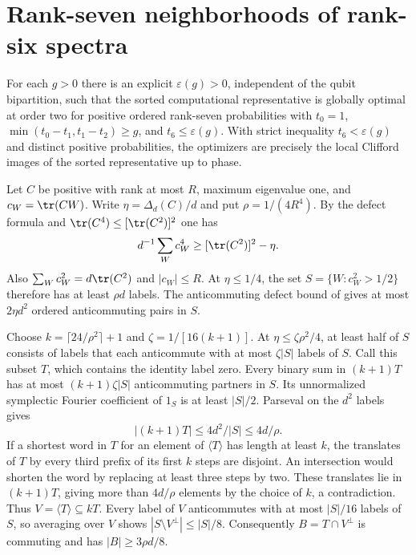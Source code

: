 \section{Rank-seven neighborhoods of rank-six spectra}

\begin{theorem}\label{thm:rank6-neighborhood}
For each \(g>0\) there is an explicit \(\varepsilon(g)>0\),
independent of the qubit bipartition, such that the sorted
computational representative is globally optimal at order two
for positive ordered rank-seven probabilities with \(t_0=1\),
\(\min(t_0-t_1,t_1-t_2)\ge g\), and \(t_6\le\varepsilon(g)\).
With strict inequality \(t_6<\varepsilon(g)\) and distinct
positive probabilities, the optimizers are precisely the local
Clifford images of the sorted representative up to phase.
\end{theorem}

Let \(C\) be positive with rank at most \(R\), maximum eigenvalue
one, and \(c_W=\tr(CW)\). Write \(\eta=\Delta_d(C)/d\) and put
\(\rho=1/(4R^4)\). By the defect formula and
\(\tr(C^4)\le[\tr(C^2)]^2\) one has
\[
 d^{-1}\sum_W c_W^4\ge [\tr(C^2)]^2-\eta.
\]
Also \(\sum_W c_W^2=d\tr(C^2)\) and \(|c_W|\le R\). At
\(\eta\le1/4\), the set \(S=\{W:c_W^2>1/2\}\) therefore has
at least \(\rho d\) labels. The anticommuting defect bound
of \cite[Theorem~14]{sierant} gives at most \(2\eta d^2\)
ordered anticommuting pairs in \(S\).

Choose \(k=\lceil24/\rho^2\rceil+1\) and
\(\zeta=1/[16(k+1)]\). At \(\eta\le\zeta\rho^2/4\), at
least half of \(S\) consists of labels that each anticommute
with at most \(\zeta|S|\) labels of \(S\). Call this subset
\(T\), which contains the identity label zero. Every binary
sum in \((k+1)T\) has at most \((k+1)\zeta|S|\) anticommuting
partners in \(S\). Its unnormalized symplectic Fourier
coefficient of \(1_S\) is at least \(|S|/2\). Parseval on the
\(d^2\) labels gives
\[
 |(k+1)T|\le4d^2/|S|\le4d/\rho .
\]
If a shortest word in \(T\) for an element of \(\langle T\rangle\)
has length at least \(k\), the translates of \(T\) by every
third prefix of its first \(k\) steps are disjoint. An
intersection would shorten the word by replacing at least
three steps by two. These translates lie in \((k+1)T\), giving
more than \(4d/\rho\) elements by the choice of \(k\), a
contradiction. Thus \(V=\langle T\rangle\subseteq kT\).
Every label of \(V\) anticommutes with at most \(|S|/16\)
labels of \(S\), so averaging over \(V\) shows
\(|S\setminus V^\perp|\le|S|/8\).
Consequently \(B=T\cap V^\perp\) is commuting and has
\(|B|\ge3\rho d/8\).

